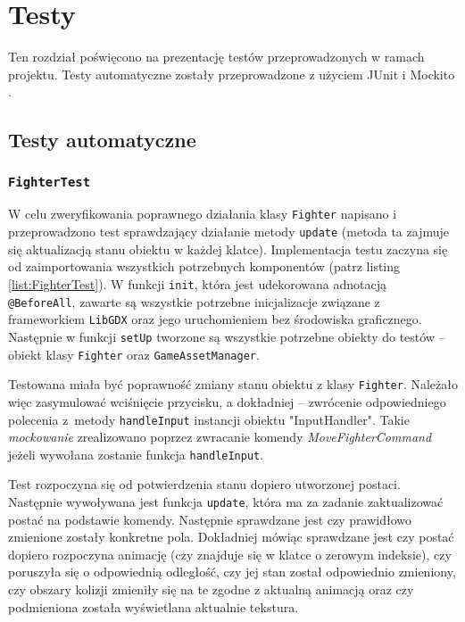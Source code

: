 \chapter{Testy}
Ten rozdział poświęcono na prezentację testów przeprowadzonych w ramach projektu. Testy automatyczne zostały przeprowadzone z użyciem JUnit \cite{JUnit} i Mockito \cite{Mockito}.

\section{Testy automatyczne}
\subsection{\texttt{FighterTest}}
W celu zweryfikowania poprawnego działania klasy \texttt{Fighter} napisano i przeprowadzono test sprawdzający działanie metody \texttt{update} (metoda ta zajmuje się aktualizacją stanu obiektu w każdej klatce). Implementacja testu zaczyna się od zaimportowania wszystkich potrzebnych komponentów (patrz listing \ref{list:FighterTest}). W funkcji \texttt{init}, która jest udekorowana adnotacją \texttt{@BeforeAll}, zawarte są wszystkie potrzebne inicjalizacje związane z frameworkiem \texttt{LibGDX} oraz jego uruchomieniem bez środowiska graficznego. Następnie w funkcji \texttt{setUp} tworzone są wszystkie potrzebne obiekty do testów -- obiekt klasy \texttt{Fighter} oraz \texttt{GameAssetManager}. 

Testowana miała być poprawność zmiany stanu obiektu z klasy \texttt{Fighter}. Należało więc zasymulować wciśnięcie przycisku, a dokładniej -- zwrócenie odpowiedniego polecenia z~metody \texttt{handleInput} instancji obiektu "InputHandler". Takie \emph{mockowanie} zrealizowano poprzez zwracanie komendy \emph{MoveFighterCommand} jeżeli wywołana zostanie funkcja \texttt{handleInput}.

Test rozpoczyna się od potwierdzenia stanu dopiero utworzonej postaci. Następnie wywoływana jest funkcja \texttt{update}, która ma za zadanie zaktualizować postać na podstawie komendy. Następnie sprawdzane jest czy prawidłowo zmienione zostały konkretne pola. Dokładniej mówiąc sprawdzane jest czy postać dopiero rozpoczyna animację (czy znajduje się w klatce o zerowym indeksie), czy poruszyła się o odpowiednią odległość, czy jej stan został odpowiednio zmieniony, czy obszary kolizji zmieniły się na te zgodne z aktualną animacją oraz czy podmieniona została wyświetlana aktualnie tekstura. 

